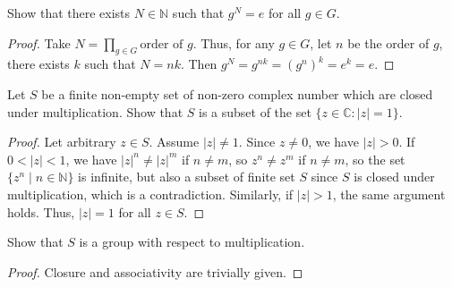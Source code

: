 \documentclass[12pt]{article}
\begin{document}
\begin{subquestion}
    Show that there exists $N \in \mathbb{N}$ such that $g^{N} = e$
    for all $g \in G$.
\end{subquestion}
\begin{proof}
    Take $N = \prod\limits_{g \in G} \text{order of }g$.
    Thus, for any $g \in G$, let $n$ be the order of $g$,
    there exists $k$ such that $N = nk$.
    Then $g^{N} = g^{nk} = (g^{n})^{k} = e^{k} = e$.
\end{proof}

\begin{question}
    Let $S$ be a finite non-empty set of non-zero complex number
    which are closed under multiplication.
    Show that $S$ is a subset of the set $\{z \in \mathbb{C} : |z| = 1\}$.
\end{question}
\begin{proof}
    Let arbitrary $z \in S$. Assume $|z| \ne 1$.
    Since $z \ne 0$, we have $|z| > 0$.
    If $0 < |z| < 1$, 
    we have $|z|^{n} \ne |z|^{m}$ if $n \ne m$,
    so $z^{n} \ne z^{m}$ if $n \ne m$,
    so the set $\{z^{n} \mid n \in \mathbb{N}\}$
    is infinite, but also a subset of finite set $S$ 
    since $S$ is closed under multiplication,
    which is a contradiction.
    Similarly, if $|z| > 1$, the same argument holds.
    Thus, $|z| = 1$ for all $z \in S$.
\end{proof}

\begin{subquestion}
    Show that $S$ is a group with respect to multiplication.
\end{subquestion}
\begin{proof}
    Closure and associativity are trivially given.

\end{proof}
\end{document}
